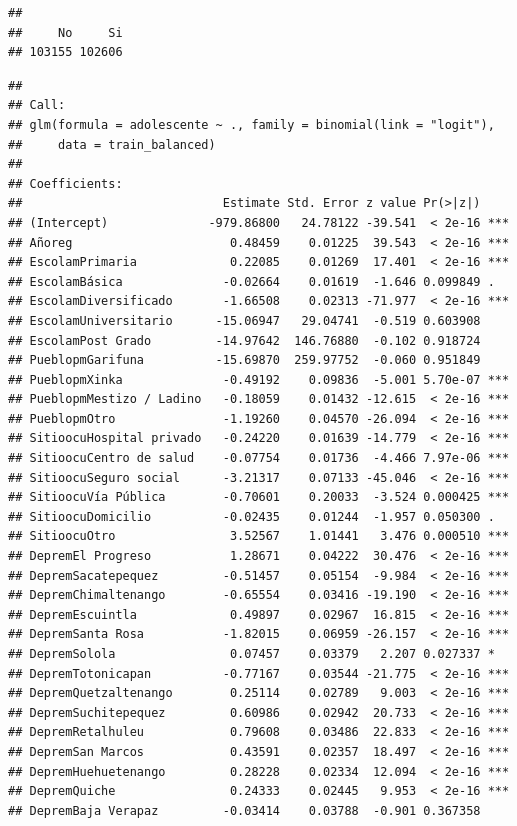 \documentclass[
]{article}
\begin{document}
\begin{verbatim}
## 
##     No     Si 
## 103155 102606
\end{verbatim}

\begin{verbatim}
## 
## Call:
## glm(formula = adolescente ~ ., family = binomial(link = "logit"), 
##     data = train_balanced)
## 
## Coefficients:
##                            Estimate Std. Error z value Pr(>|z|)    
## (Intercept)              -979.86800   24.78122 -39.541  < 2e-16 ***
## Añoreg                      0.48459    0.01225  39.543  < 2e-16 ***
## EscolamPrimaria             0.22085    0.01269  17.401  < 2e-16 ***
## EscolamBásica              -0.02664    0.01619  -1.646 0.099849 .  
## EscolamDiversificado       -1.66508    0.02313 -71.977  < 2e-16 ***
## EscolamUniversitario      -15.06947   29.04741  -0.519 0.603908    
## EscolamPost Grado         -14.97642  146.76880  -0.102 0.918724    
## PueblopmGarifuna          -15.69870  259.97752  -0.060 0.951849    
## PueblopmXinka              -0.49192    0.09836  -5.001 5.70e-07 ***
## PueblopmMestizo / Ladino   -0.18059    0.01432 -12.615  < 2e-16 ***
## PueblopmOtro               -1.19260    0.04570 -26.094  < 2e-16 ***
## SitioocuHospital privado   -0.24220    0.01639 -14.779  < 2e-16 ***
## SitioocuCentro de salud    -0.07754    0.01736  -4.466 7.97e-06 ***
## SitioocuSeguro social      -3.21317    0.07133 -45.046  < 2e-16 ***
## SitioocuVía Pública        -0.70601    0.20033  -3.524 0.000425 ***
## SitioocuDomicilio          -0.02435    0.01244  -1.957 0.050300 .  
## SitioocuOtro                3.52567    1.01441   3.476 0.000510 ***
## DepremEl Progreso           1.28671    0.04222  30.476  < 2e-16 ***
## DepremSacatepequez         -0.51457    0.05154  -9.984  < 2e-16 ***
## DepremChimaltenango        -0.65554    0.03416 -19.190  < 2e-16 ***
## DepremEscuintla             0.49897    0.02967  16.815  < 2e-16 ***
## DepremSanta Rosa           -1.82015    0.06959 -26.157  < 2e-16 ***
## DepremSolola                0.07457    0.03379   2.207 0.027337 *  
## DepremTotonicapan          -0.77167    0.03544 -21.775  < 2e-16 ***
## DepremQuetzaltenango        0.25114    0.02789   9.003  < 2e-16 ***
## DepremSuchitepequez         0.60986    0.02942  20.733  < 2e-16 ***
## DepremRetalhuleu            0.79608    0.03486  22.833  < 2e-16 ***
## DepremSan Marcos            0.43591    0.02357  18.497  < 2e-16 ***
## DepremHuehuetenango         0.28228    0.02334  12.094  < 2e-16 ***
## DepremQuiche                0.24333    0.02445   9.953  < 2e-16 ***
## DepremBaja Verapaz         -0.03414    0.03788  -0.901 0.367358    

\end{verbatim}
\end{document}
